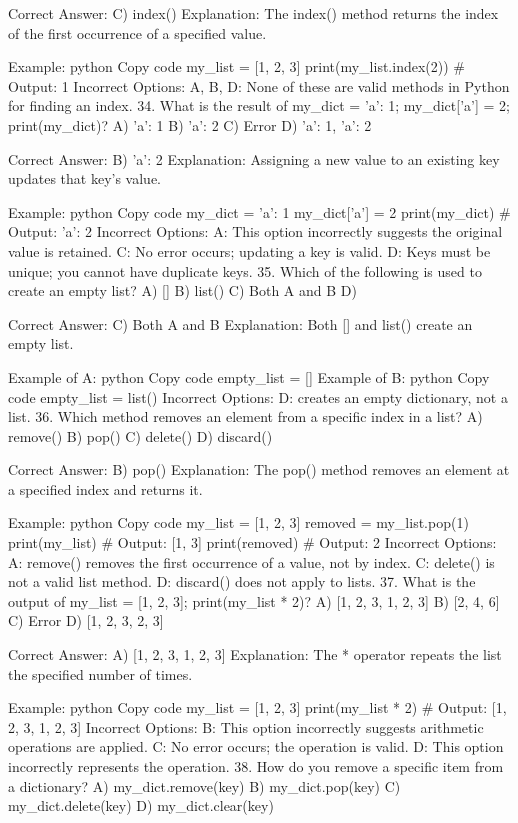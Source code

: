 Correct Answer: C) index()
Explanation: The index() method returns the index of the first occurrence of a specified value.

Example:
python
Copy code
my_list = [1, 2, 3]
print(my_list.index(2))  # Output: 1
Incorrect Options:
A, B, D: None of these are valid methods in Python for finding an index.
34. What is the result of my_dict = {'a': 1}; my_dict['a'] = 2; print(my_dict)?
A) {'a': 1}
B) {'a': 2}
C) Error
D) {'a': 1, 'a': 2}

Correct Answer: B) {'a': 2}
Explanation: Assigning a new value to an existing key updates that key's value.

Example:
python
Copy code
my_dict = {'a': 1}
my_dict['a'] = 2
print(my_dict)  # Output: {'a': 2}
Incorrect Options:
A: This option incorrectly suggests the original value is retained.
C: No error occurs; updating a key is valid.
D: Keys must be unique; you cannot have duplicate keys.
35. Which of the following is used to create an empty list?
A) []
B) list()
C) Both A and B
D) {}

Correct Answer: C) Both A and B
Explanation: Both [] and list() create an empty list.

Example of A:
python
Copy code
empty_list = []
Example of B:
python
Copy code
empty_list = list()
Incorrect Options:
D: {} creates an empty dictionary, not a list.
36. Which method removes an element from a specific index in a list?
A) remove()
B) pop()
C) delete()
D) discard()

Correct Answer: B) pop()
Explanation: The pop() method removes an element at a specified index and returns it.

Example:
python
Copy code
my_list = [1, 2, 3]
removed = my_list.pop(1)
print(my_list)  # Output: [1, 3]
print(removed)  # Output: 2
Incorrect Options:
A: remove() removes the first occurrence of a value, not by index.
C: delete() is not a valid list method.
D: discard() does not apply to lists.
37. What is the output of my_list = [1, 2, 3]; print(my_list * 2)?
A) [1, 2, 3, 1, 2, 3]
B) [2, 4, 6]
C) Error
D) [1, 2, 3, 2, 3]

Correct Answer: A) [1, 2, 3, 1, 2, 3]
Explanation: The * operator repeats the list the specified number of times.

Example:
python
Copy code
my_list = [1, 2, 3]
print(my_list * 2)  # Output: [1, 2, 3, 1, 2, 3]
Incorrect Options:
B: This option incorrectly suggests arithmetic operations are applied.
C: No error occurs; the operation is valid.
D: This option incorrectly represents the operation.
38. How do you remove a specific item from a dictionary?
A) my_dict.remove(key)
B) my_dict.pop(key)
C) my_dict.delete(key)
D) my_dict.clear(key)

